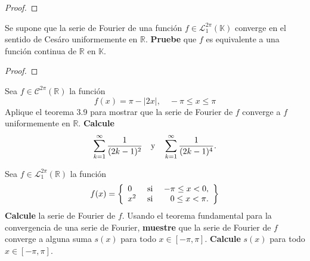 \documentclass[12pt]{report}
\theoremstyle{largebreak}
\newcommand\abs[1]{\ensuremath{\left|#1\right|}}
\begin{document}
    \begin{proof}
        
    \end{proof}

    \begin{excer}
        Se supone que la serie de Fourier de una función $f\in\mathcal{L}_1^{2\pi}(\mathbb{K})$ converge en el sentido de Cesáro uniformemente en $\mathbb{R}$. \textbf{Pruebe} que $f$ es equivalente a una función continua de $\mathbb{R}$ en $\mathbb{K}$.
    \end{excer}

    \begin{proof}
        
    \end{proof}

    \begin{excer}
        Sea $f\in\mathcal{C}^{2\pi}(\mathbb{R})$ la función
        \begin{equation*}
            f(x)=\pi-\abs{2x},\quad-\pi\leq x\leq\pi
        \end{equation*}
        Aplique el teorema 3.9 para mostrar que la serie de Fourier de $f$ converge a $f$ uniformemente en $\mathbb{R}$. \textbf{Calcule}
        \begin{equation*}
            \sum_{ k=1}^\infty\frac{1}{(2k-1)^2}\quad\textup{y}\quad\sum_{ k=1}^\infty\frac{1}{(2k-1)^4}.
        \end{equation*}
    \end{excer}

    \begin{sol}
        
    \end{sol}

    \begin{excer}
        Sea $f\in\mathcal{L}_1^{2\pi}(\mathbb{R})$ la función
        \begin{equation*}
            f(x)=\left\{ 
                \begin{array}{lcr}
                    0 & \textup{ si } & -\pi\leq x<0,\\
                    x^2 & \textup{ si } & 0\leq x<\pi.\\
                \end{array}
            \right\}
        \end{equation*}
        \textbf{Calcule} la serie de Fourier de $f$. Usando el teorema fundamental para la convergencia de una serie de Fourier, \textbf{muestre} que la serie de Fourier de $f$ converge a alguna suma $s(x)$ para todo $x\in[-\pi,\pi]$. \textbf{Calcule} $s(x)$ para todo $x\in[-\pi,\pi]$.
    \end{excer}
\end{document}
